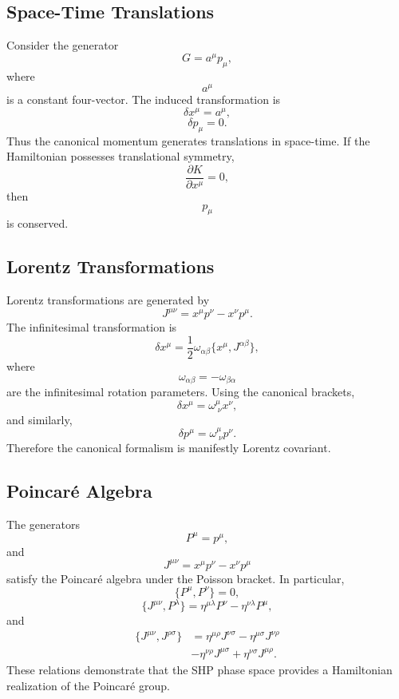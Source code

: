 \subsection{Space-Time Translations}
Consider the generator
\[G=a^\mu p_\mu,\]
where
\[a^\mu\]
is a constant four-vector.
The induced transformation is
\[\delta x^\mu=a^\mu,\]
\[\delta p_\mu=0.\]
Thus the canonical momentum generates translations in space-time.
If the Hamiltonian possesses translational symmetry,
\[\frac{\partial K}{\partial x^\mu}=0,\]
then
\[p_\mu\]
is conserved.
\subsection{Lorentz Transformations}
Lorentz transformations are generated by
\[\boxed{J^{\mu\nu}=x^\mu p^\nu-x^\nu p^\mu.}\]
The infinitesimal transformation is
\[\delta x^\mu=\frac12\omega_{\alpha\beta}\{x^\mu,J^{\alpha\beta}\},\]
where
\[\omega_{\alpha\beta}=-\omega_{\beta\alpha}\]
are the infinitesimal rotation parameters.
Using the canonical brackets,
\[\boxed{\delta x^\mu=\omega^\mu_{\;\nu}x^\nu,}\]
and similarly,
\[\boxed{\delta p^\mu=\omega^\mu_{\;\nu}p^\nu.}\]
Therefore the canonical formalism is manifestly Lorentz covariant.
\subsection{Poincaré Algebra}
The generators
\[P^\mu=p^\mu,\]
and
\[J^{\mu\nu}=x^\mu p^\nu-x^\nu p^\mu\]
satisfy the Poincaré algebra under the Poisson bracket.
In particular,
\[\boxed{\{P^\mu,P^\nu\}=0,}\]
\[\boxed{\{J^{\mu\nu},P^\lambda\}=\eta^{\mu\lambda}P^\nu-\eta^{\nu\lambda}P^\mu,}\]
and
\[\boxed{\begin{aligned}
\{J^{\mu\nu},J^{\rho\sigma}\}
    &=\eta^{\mu\rho}J^{\nu\sigma}-\eta^{\mu\sigma}J^{\nu\rho}\\
&-\eta^{\nu\rho}J^{\mu\sigma}+\eta^{\nu\sigma}J^{\mu\rho}.
\end{aligned}}\]
These relations demonstrate that the SHP phase space provides a
Hamiltonian realization of the Poincaré group.
